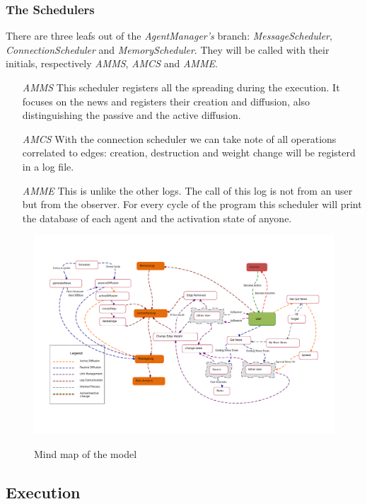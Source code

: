 \subsubsection{The Schedulers}
There are three leafs out of the \textit{AgentManager's} branch:
\textit{MessageScheduler}, \textit{ConnectionScheduler} and
\textit{MemoryScheduler}. They will be called with their initials,
respectively \textit{AMMS}, \textit{AMCS} and \textit{AMME}.
\begin{itemize}
\item[\textit{AMMS}] This scheduler registers all the spreading during the
  execution. It focuses on the news and registers their creation and
  diffusion, also distinguishing the passive and the active diffusion.
\item[\textit{AMCS}] With the connection scheduler we can take note of
  all operations correlated to edges: creation, destruction and weight
  change will be registerd in a log file.
\item[\textit{AMME}] This is unlike the other logs. The call of this log is
  not from an user but from the observer. For every cycle of the program
  this scheduler will print the database of each agent and the activation
  state of anyone.
\end{itemize}
\begin{figure}[htpb]
  \centering
  \includegraphics[width=\columnwidth]{img/pdf/mindMap.pdf}
  \label{fig:mindmap}
  \caption{Mind map of the model}
\end{figure}

\subsection{Execution}



